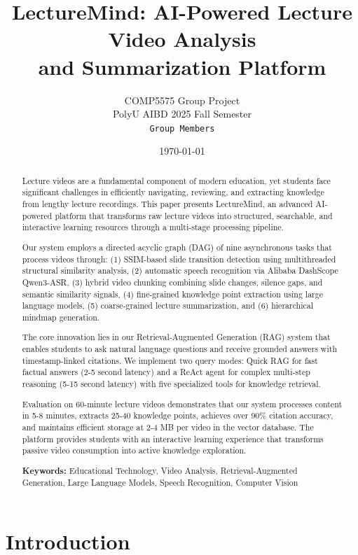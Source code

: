 \documentclass[12pt,a4paper]{article}
\title{\textbf{\Large LectureMind: AI-Powered Lecture Video Analysis \\ and Summarization Platform}}
\author{
    COMP5575 Group Project \\
    PolyU AIBD 2025 Fall Semester \\
    \texttt{Group Members}
}
\date{\today}
\begin{document}
\maketitle

\begin{abstract}
\noindent Lecture videos are a fundamental component of modern education, yet students face significant challenges in efficiently navigating, reviewing, and extracting knowledge from lengthy lecture recordings. This paper presents LectureMind, an advanced AI-powered platform that transforms raw lecture videos into structured, searchable, and interactive learning resources through a multi-stage processing pipeline.

Our system employs a directed acyclic graph (DAG) of nine asynchronous tasks that process videos through: (1) SSIM-based slide transition detection using multithreaded structural similarity analysis, (2) automatic speech recognition via Alibaba DashScope Qwen3-ASR, (3) hybrid video chunking combining slide changes, silence gaps, and semantic similarity signals, (4) fine-grained knowledge point extraction using large language models, (5) coarse-grained lecture summarization, and (6) hierarchical mindmap generation.

The core innovation lies in our Retrieval-Augmented Generation (RAG) system that enables students to ask natural language questions and receive grounded answers with timestamp-linked citations. We implement two query modes: Quick RAG for fast factual answers (2-5 second latency) and a ReAct agent for complex multi-step reasoning (5-15 second latency) with five specialized tools for knowledge retrieval.

Evaluation on 60-minute lecture videos demonstrates that our system processes content in 5-8 minutes, extracts 25-40 knowledge points, achieves over 90\% citation accuracy, and maintains efficient storage at 2-4 MB per video in the vector database. The platform provides students with an interactive learning experience that transforms passive video consumption into active knowledge exploration.

\textbf{Keywords:} Educational Technology, Video Analysis, Retrieval-Augmented Generation, Large Language Models, Speech Recognition, Computer Vision
\end{abstract}

\tableofcontents
\newpage

\section{Introduction}
\label{sec:introduction}
\end{document}

